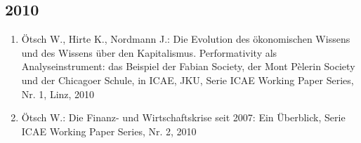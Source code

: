 \subsection*{2010}
\begin{enumerate}
    	 \item Ötsch W., Hirte K., Nordmann J.: Die Evolution des ökonomischen Wissens und des Wissens über den Kapitalismus. Performativity als Analyseinstrument: das Beispiel der Fabian Society, der Mont Pèlerin Society und der Chicagoer Schule, in ICAE, JKU, Serie ICAE Working Paper Series, Nr. 1, Linz, 2010
	 \item Ötsch W.: Die Finanz-­ und Wirtschaftskrise seit 2007: Ein Überblick, Serie ICAE Working Paper Series, Nr. 2, 2010
\end{enumerate}
